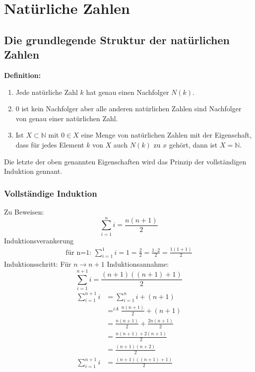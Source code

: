 \chapter{Natürliche Zahlen} %
\label{cha:natürliche_zahlen}

\section{Die grundlegende Struktur der natürlichen Zahlen} %
\label{sec:die_grundlegende_struktur_der_natürlichen_zahlen}
\textbf{Definition:} 
\begin{enumerate}
	\item Jede natürliche Zahl \(k\) hat genau einen Nachfolger \(N(k)\).
	\item 0 ist kein Nachfolger aber alle anderen natürlichen Zahlen sind Nachfolger von genau einer natürlichen Zahl.
	\item Ist \(X \subset \mathbb{N}\) mit \(0 \in X\) eine Menge von natürlichen Zahlen mit der Eigenschaft, dass für jedes Element \(k\) von \(X\) auch \(N(k)\) zu \(x\) gehört, dann ist \(X = \mathbb{N}\).
\end{enumerate}
Die letzte der oben genannten Eigenschaften wird das Prinzip der vollständigen Induktion gennant.
\subsection{Vollständige Induktion} %
\label{sub:vollständige_induktion}
Zu Beweisen:\[\sum_{i=1}^n i = \frac{n(n+1)}{2} \]
Induktionsverankerung
\begin{align*}
	\text{für n=1: } \sum_{i=1}^1 i = 1 = \frac{2}{2} = \frac{1\cdot2}{2} = \frac{1(1+1)}{2}
\end{align*}
Induktionsschritt: Für \(n \rightarrow n+1\) \newline
Induktionsannahme:
\[ \sum_{i=1}^{n+1} i = \frac{(n+1)((n+1)+1)}{2} \]
\begin{align*}
	\sum_{i=1}^{n+1} i &= \sum_{i=1}^{n} i + (n+1) \\
	&=^{iA} \frac{n(n+1)}{2} + (n+1) \\
	&= \frac{n(n+1)}{2} +  \frac{2n(n+1)}{2} \\
	&= \frac{n(n+1)+2(n+1)}{2} \\
	&= \frac{(n+1)(n+2)}{2} \\
	\sum_{i=1}^{n+1} i &= \frac{(n+1)((n+1)+1)}{2}
\end{align*}


